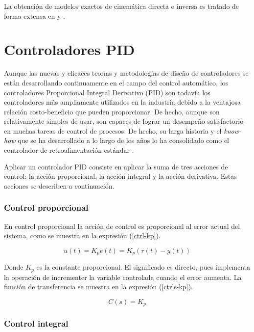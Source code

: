 La obtención de modelos exactos de cinemática directa e inversa es tratado de forma extensa en \cite{cole2007} y \cite{predescu2015}.

\section{Controladores PID}

Aunque las nuevas y eficaces teorías y metodologías de diseño de controladores se están desarrollando continuamente en el campo del control automático, los controladores Proporcional Integral Derivativo (PID) son todavía los controladores más ampliamente utilizados en la industria debido a la ventajosa relación costo-beneficio que pueden proporcionar. De hecho, aunque son relativamente simples de usar, son capaces de lograr un desempeño satisfactorio en muchas tareas de control de procesos. De hecho, su larga historia y el \textit{know-how} que se ha desarrollado a lo largo de los años lo ha consolidado como el controlador de retroalimentación estándar \cite{practical_pid}.

Aplicar un controlador PID consiste en aplicar la suma de tres acciones de control: la acción proporcional, la acción integral y la acción derivativa. Estas acciones se describen a continuación.

\subsubsection{Control proporcional}
En control proporcional la acción de control es proporcional al error actual del sistema, como se muestra en la expresión (\ref{ctrl-kp}).

\begin{equation}\label{ctrl-kp}
u(t) = K_p e(t) = K_p(r(t)-y(t))
\end{equation}

Donde $K_p$ es la constante proporcional. El significado es directo, pues implementa la operación de incrementer la variable controlada cuando el error aumenta. La función de transferencia se muestra en la expresión (\ref{ctrls-kp}).

\begin{equation}\label{ctrls-kp}
C(s) = K_p
\end{equation}

\subsubsection{Control integral}

